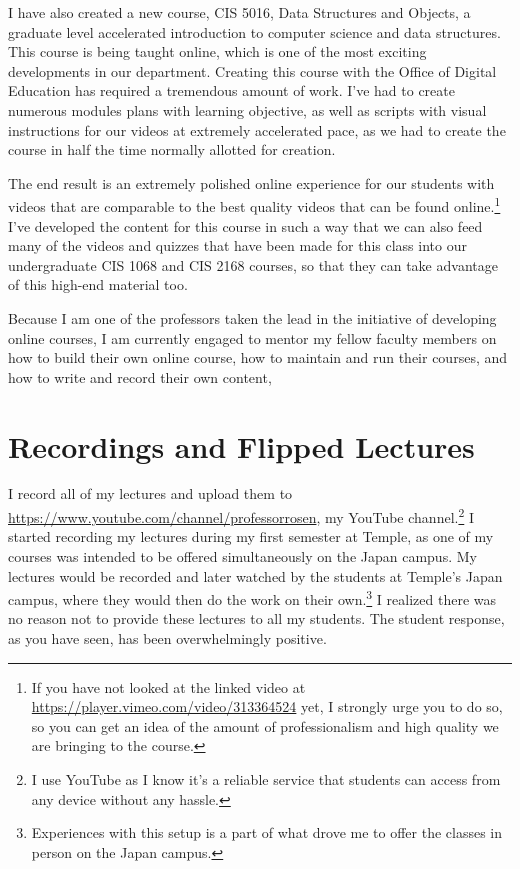 \documentclass[10pt]{article}
\begin{document}
I have also created a new course, CIS 5016, Data Structures and Objects, a graduate level accelerated introduction to computer science and data structures.
This course is being taught online, which is one of the most exciting developments in our department.
Creating this course with the Office of Digital Education has required a tremendous amount of work.  
I've had to create numerous modules plans with learning objective, as well as scripts with visual instructions for our videos at extremely accelerated pace, as we had to create the course in half the time normally allotted for creation.

The end result is an extremely polished online experience for our students with videos that are comparable to the best quality videos that can be found online.\footnote{If you have not looked at the linked video at \url{https://player.vimeo.com/video/313364524} yet, I strongly urge you to do so, so you can get an idea of the amount of professionalism and high quality we are bringing to the course.} 
I've developed the content for this course in such a way that we can also feed many of the videos and quizzes that have been made for this class into our undergraduate CIS 1068 and CIS 2168 courses, so that they can take advantage of this high-end material too.

Because I am one of the professors taken the lead in the initiative of developing online courses, I am currently engaged to mentor my fellow faculty members on how to build their own online course, how to maintain and run their courses, and how to write and record their own content,

\section{Recordings and Flipped Lectures}

I record all of my lectures and upload them to \url{https://www.youtube.com/channel/professorrosen}, my YouTube channel.\footnote{I use YouTube as I know it's a reliable service that students can access from any device without any hassle.}  
I started recording my lectures during my first semester at Temple, as one of my courses was intended to be offered simultaneously on the Japan campus.  My lectures would be recorded and later watched by the students at Temple's Japan campus, where they would then do the work on their own.\footnote{Experiences with this setup is a part of what drove me to offer the classes in person on the Japan campus.}
I realized there was no reason not to provide these lectures to all my students.
The student response, as you have seen, has been overwhelmingly positive.
\end{document}
